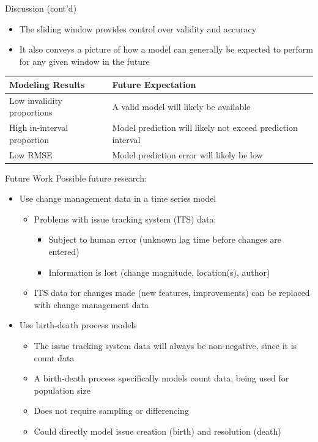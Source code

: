 \documentclass[presentation]{beamer}
\begin{document}
\begin{frame}[t]{Discussion (cont'd)}
\begin{itemize}
\item{The sliding window provides control over validity and accuracy}
\item{It also conveys a picture of how a model can generally be expected
to perform for any given window in the future}
\end{itemize}

\begin{table}[htbp]
\centering
\scriptsize
\begin{tabular}{ p{} | p{} }
  \hline
  Modeling Results & Future Expectation \\
  \hline
  Low invalidity proportions & A valid model will likely be available \\
  High in-interval proportion & Model prediction will likely not exceed prediction interval \\
  Low RMSE & Model prediction error will likely be low \\
  \hline
\end{tabular}
\end{table}

\end{frame}


\begin{frame}[t]{Future Work}
Possible future research:
\begin{itemize}

\item{Use change management data in a time series model
\begin{itemize}
\item{Problems with issue tracking system (ITS) data:
\begin{itemize}
\item{Subject to human error (unknown lag time before changes are entered)}
\item{Information is lost (change magnitude, location(s), author)}
\end{itemize}}
\item{ITS data for changes made (new features, improvements) can be replaced with change management data}
\end{itemize}
}

\item{Use birth-death process models
\begin{itemize}
\item{The issue tracking system data will always be non-negative, since it is count data}
\item{A birth-death process specifically models count data, being used for population size}
\item{Does not require sampling or differencing}
\item{Could directly model issue creation (birth) and resolution (death)}
\end{itemize}
}

\end{itemize}
\end{frame}
\end{document}
